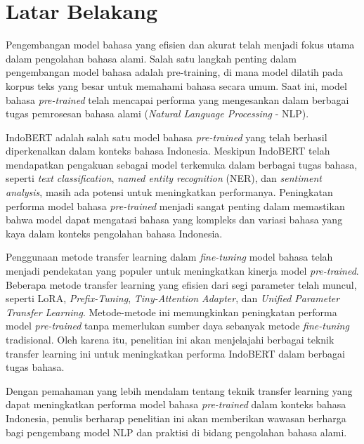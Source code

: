 \section{Latar Belakang}

Pengembangan model bahasa yang efisien dan akurat telah menjadi fokus utama dalam pengolahan bahasa alami. Salah satu langkah penting dalam pengembangan model bahasa adalah pre-training, di mana model dilatih pada korpus teks yang besar untuk memahami bahasa secara umum. Saat ini, model bahasa \textit{pre-trained} telah mencapai performa yang mengesankan dalam berbagai tugas pemrosesan bahasa alami (\textit{Natural Language Processing} - NLP).

IndoBERT adalah salah satu model bahasa \textit{pre-trained} yang telah berhasil diperkenalkan dalam konteks bahasa Indonesia. Meskipun IndoBERT telah mendapatkan pengakuan sebagai model terkemuka dalam berbagai tugas bahasa, seperti \textit{text classification},  \textit{named entity recognition} (NER), dan \textit{sentiment analysis}, masih ada potensi untuk meningkatkan performanya. Peningkatan performa model bahasa \textit{pre-trained} menjadi sangat penting dalam memastikan bahwa model dapat mengatasi bahasa yang kompleks dan variasi bahasa yang kaya dalam konteks pengolahan bahasa Indonesia.

Penggunaan metode transfer learning dalam \textit{fine-tuning} model bahasa telah menjadi pendekatan yang populer untuk meningkatkan kinerja model \textit{pre-trained}. Beberapa metode transfer learning yang efisien dari segi parameter telah muncul,  seperti LoRA, \textit{Prefix-Tuning}, \textit{Tiny-Attention Adapter}, dan \textit{Unified Parameter Transfer Learning}. Metode-metode ini memungkinkan peningkatan performa model \textit{pre-trained} tanpa memerlukan sumber daya sebanyak metode \textit{fine-tuning} tradisional. Oleh karena itu, penelitian ini akan menjelajahi berbagai teknik transfer learning ini untuk meningkatkan performa IndoBERT dalam berbagai tugas bahasa.

Dengan pemahaman yang lebih mendalam tentang teknik transfer learning yang dapat meningkatkan performa model bahasa \textit{pre-trained} dalam konteks bahasa Indonesia, penulis berharap penelitian ini akan memberikan wawasan berharga bagi pengembang model NLP dan praktisi di bidang pengolahan bahasa alami.
